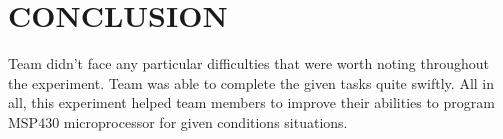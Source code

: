 \documentclass[pdftex,12pt,a4paper]{article}
\begin{document}
\newpage
\section{CONCLUSION}
Team didn't face any particular difficulties that were worth noting throughout the experiment. Team was able to complete the given tasks quite swiftly. All in all, this experiment helped team members to improve their abilities to program MSP430 microprocessor for given conditions situations.

\nocite{overleaf}
\nocite{reportGuide}
\newpage
{}



\end{document}
